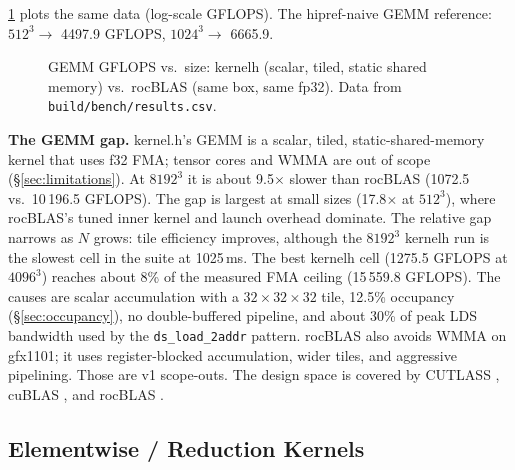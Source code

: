 \documentclass[10pt,twoside]{article}
\begin{document}
\cref{fig:gemm} plots the same data (log-scale GFLOPS). The hipref-naive GEMM reference:
$512^3 \to$ 4497.9 GFLOPS, $1024^3 \to$ 6665.9.

\begin{figure}[H]
\centering
{}
\caption{GEMM GFLOPS vs.\ size: kernelh (scalar, tiled, static shared memory) vs.\ rocBLAS
(same box, same fp32). Data from \texttt{build/bench/results.csv}.}
\label{fig:gemm}
\end{figure}

\textbf{The GEMM gap.} kernel.h's GEMM is a scalar, tiled, static-shared-memory kernel that
uses f32 FMA; tensor cores and WMMA are out of scope (\S\ref{sec:limitations}). At
$8192^3$ it is about 9.5$\times$ slower than rocBLAS (1072.5 vs.\ 10\,196.5 GFLOPS). The gap
is largest at small sizes (17.8$\times$ at $512^3$), where rocBLAS's tuned inner kernel and
launch overhead dominate. The relative gap narrows as $N$ grows: tile efficiency improves,
although the $8192^3$ kernelh run is the slowest cell in the suite at 1025\,ms. The best
kernelh cell (1275.5 GFLOPS at $4096^3$) reaches about 8\% of the measured FMA ceiling
(15\,559.8 GFLOPS). The causes are scalar accumulation with a $32\times32\times32$ tile,
12.5\% occupancy (\S\ref{sec:occupancy}), no double-buffered pipeline, and about 30\% of peak
LDS bandwidth used by the \texttt{ds\_load\_2addr} pattern. rocBLAS also avoids WMMA on
gfx1101; it uses register-blocked accumulation, wider tiles, and aggressive pipelining. Those
are v1 scope-outs. The design space is covered by CUTLASS \cite{cutlass_github}, cuBLAS
\cite{cublas_docs}, and rocBLAS \cite{rocblas_docs}.

\subsection{Elementwise / Reduction Kernels}
\label{sec:elem}
\end{document}
